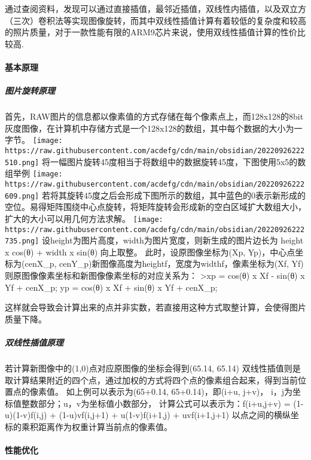 \documentclass[
]{article}
\begin{document}
通过查阅资料，发现可以通过直接插值，最邻近插值，双线性内插值，以及双立方（三次）卷积法等实现图像旋转，而其中双线性插值计算有着较低的复杂度和较高的照片质量，对于一款性能有限的ARM9芯片来说，使用双线性插值计算的性价比较高.

\hypertarget{ux57faux672cux539fux7406}{%
\paragraph{基本原理}\label{ux57faux672cux539fux7406}}

\hypertarget{ux56feux7247ux65cbux8f6cux539fux7406}{%
\subparagraph{图片旋转原理}\label{ux56feux7247ux65cbux8f6cux539fux7406}}

首先，RAW图片的信息都以像素值的方式存储在每个像素点上，而128x128的8bit灰度图像，在计算机中存储方式是一个128x128的数组，其中每个数据的大小为一字节。
\texttt{[image: https://raw.githubusercontent.com/acdefg/cdn/main/obsidian/20220926222510.png]}
将一幅图片旋转45度相当于将数组中的数据旋转45度，下图使用5x5的数组举例
\texttt{[image: https://raw.githubusercontent.com/acdefg/cdn/main/obsidian/20220926222609.png]}
若将其旋转45度之后会形成下图所示的数组，其中蓝色的0表示新形成的空位。易得矩阵围绕中心点旋转，将矩阵旋转会形成新的空白区域扩大数组大小，扩大的大小可以用几何方法求解。
\texttt{[image: https://raw.githubusercontent.com/acdefg/cdn/main/obsidian/20220926222735.png]}
设height为图片高度，width为图片宽度，则新生成的图片边长为 \textbar{}
height x cos(θ) \textbar{} + \textbar{} width x sin(θ) \textbar{}
向上取整。 此时，设原图像坐标为(Xp, Yp)，中心点坐标为(cenX\_p,
cenY\_p)新图像高度为heightf，宽度为widthf，像素坐标为(Xf,
Yf)则原图像像素坐标和新图像像素坐标的对应关系为： \textgreater xp =
cos(θ) x Xf - sin(θ) x Yf + cenX\_p; yp = cos(θ) x Xf + sin(θ) x Yf +
cenX\_p;

这样就会导致会计算出来的点并非实数，若直接用这种方式取整计算，会使得图片质量下降。

\hypertarget{ux53ccux7ebfux6027ux63d2ux503cux539fux7406}{%
\subparagraph{双线性插值原理}\label{ux53ccux7ebfux6027ux63d2ux503cux539fux7406}}

若计算新图像中的(1,0)点对应原图像的坐标会得到(65.14, 65.14)
双线性插值则是取计算结果附近的四个点，通过加权的方式将四个点的像素组合起来，得到当前位置点的像素值。
如上例可以表示为(65+0.14, 65+0.14)，即(i+u, j+v)，
i，j为坐标值整数部分；u，v为坐标值小数部分，
计算公式可以表示为：f(i+u,j+v) = (1-u)(1-v)f(i,j) + (1-u)vf(i,j+1) +
u(1-v)f(i+1,j) + uvf(i+1,j+1)
以点之间的横纵坐标的乘积距离作为权重计算当前点的像素值。

\hypertarget{ux6027ux80fdux4f18ux5316}{%
\paragraph{性能优化}\label{ux6027ux80fdux4f18ux5316}}
\end{document}

